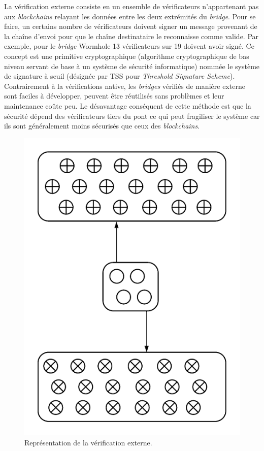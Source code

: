La vérification externe consiste en un ensemble de vérificateurs n’appartenant pas aux \textit{\gls{blockchain}s} relayant les données entre les deux extrémités du \textit{bridge}. Pour se faire, un certains nombre de vérificateurs doivent signer un message provenant de la chaîne d’envoi pour que le chaîne destinataire le reconnaisse comme valide. Par exemple, pour le \textit{bridge} Wormhole 13 vérificateurs sur 19 doivent avoir signé\cite{NomadDocsExternal}. Ce concept est une primitive cryptographique (algorithme cryptographique de bas niveau servant de base à un système de sécurité informatique) nommée le système de signature à seuil (désignée par TSS pour \textit{Threshold Signature Scheme})\cite{BinanceTSS}. 
Contrairement à la vérifications native, les \textit{bridges} vérifiés de manière externe sont faciles à développer, peuvent être réutilisés sans problèmes et leur maintenance coûte peu. Le désavantage conséquent de cette méthode est que la sécurité dépend des vérificateurs tiers du pont ce qui peut fragiliser le système car ils sont généralement moins sécurisés que ceux des \textit{\gls{blockchain}s}. \\
\begin{figure}[h!]
    \centering
\includegraphics[scale=0.70]{centralisation/imagesBridges/DiagrammeVerifExterne.png}
\caption{Représentation de la vérification externe.}
\label{fig:ExternalVerif}
\end{figure}

